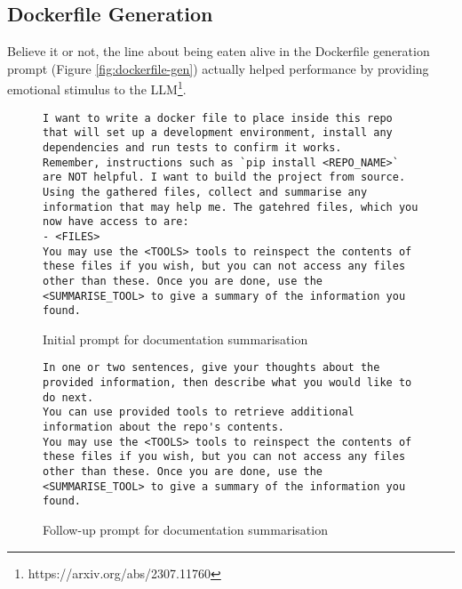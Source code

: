 \documentclass[conference]{IEEEtran}
\begin{document}
\clearpage
\subsection{Dockerfile Generation}
Believe it or not, the line about being eaten alive in the Dockerfile generation prompt (Figure \ref{fig:dockerfile-gen}) actually helped performance by providing emotional stimulus to the LLM\footnote{https://arxiv.org/abs/2307.11760}.
\begin{figure}[h!]
    \begin{lstlisting}
I want to write a docker file to place inside this repo that will set up a development environment, install any dependencies and run tests to confirm it works.
Remember, instructions such as `pip install <REPO_NAME>` are NOT helpful. I want to build the project from source.
Using the gathered files, collect and summarise any information that may help me. The gatehred files, which you now have access to are:
- <FILES>
You may use the <TOOLS> tools to reinspect the contents of these files if you wish, but you can not access any files other than these. Once you are done, use the <SUMMARISE_TOOL> to give a summary of the information you found.
    \end{lstlisting}
    \caption{Initial prompt for documentation summarisation}
\end{figure}
\begin{figure}[h!]
    \begin{lstlisting}
In one or two sentences, give your thoughts about the provided information, then describe what you would like to do next.
You can use provided tools to retrieve additional information about the repo's contents.
You may use the <TOOLS> tools to reinspect the contents of these files if you wish, but you can not access any files other than these. Once you are done, use the <SUMMARISE_TOOL> to give a summary of the information you found.
    \end{lstlisting}
    \caption{Follow-up prompt for documentation summarisation}
\end{figure}
\end{document}
